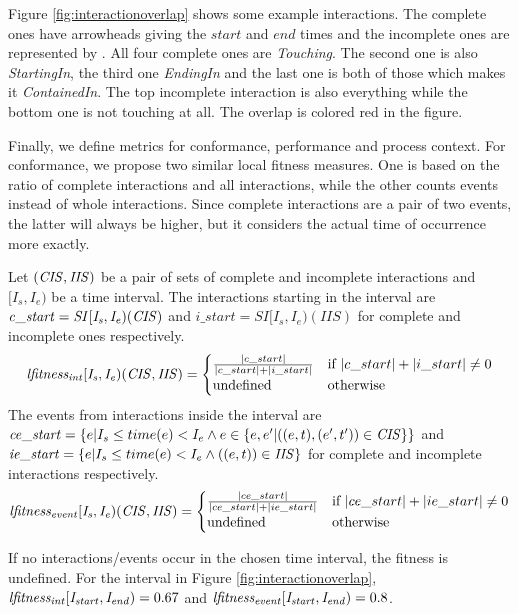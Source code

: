 Figure \ref{fig:interactionoverlap} shows some example interactions. The complete ones have arrowheads giving the $start$ and $end$ times and the incomplete ones are represented by \texttimes. All four complete ones are \emph{Touching}. The second one is also \emph{StartingIn}, the third one \emph{EndingIn} and the last one is both of those which makes it \emph{ContainedIn}. The top incomplete interaction is also everything while the bottom one is not touching at all. The overlap is colored red in the figure.

Finally, we define metrics for conformance, performance and process context.
For conformance, we propose two similar local fitness measures. One is based on the ratio of complete interactions and all interactions, while the other counts events instead of whole interactions. Since complete interactions are a pair of two events, the latter will always be higher, but it considers the actual time of occurrence more exactly.
\begin{definition}
Let $\mathit{(CIS, IIS)}$ be a pair of sets of complete and incomplete interactions and $[I_s, I_e)$ be a time interval. The interactions starting in the interval are $\mathit{c\_start = SI[I_s, I_e)(\mathit{CIS})}$ and $\mathit{i\_start = SI[I_s, I_e)(IIS)}$ for complete and incomplete ones respectively.
$$\mathit{lfitness_{int}[I_s, I_e)( \mathit{CIS}, \mathit{IIS} ) = \begin{cases} \frac{|c\_start|}{|c\_start| + |i\_start|} & \text{if } |c\_start| + |i\_start| \neq 0\\
\text{undefined} & \text{otherwise}
\end{cases}}$$
The events from interactions inside the interval are $\mathit{ce\_start} = \{e|I_s \le time(e) < I_e \wedge e \in \{e,e^\prime|((e,t),(e^\prime,t^\prime))\in \mathit{CIS}\}\}$ and $\mathit{ie\_start} = \{e|I_s \le time(e) < I_e \wedge ((e,t)) \in \mathit{IIS}\}$ for complete and incomplete interactions respectively.
$$\mathit{lfitness_{event}[I_s, I_e)( \mathit{CIS}, \mathit{IIS} ) = \begin{cases} \frac{|ce\_start|}{|ce\_start| + |ie\_start|} & \text{if } |ce\_start| + |ie\_start| \neq 0\\
\text{undefined} & \text{otherwise}
\end{cases}}$$
\end{definition}
If no interactions/events occur in the chosen time interval, the fitness is undefined. For the interval in Figure \ref{fig:interactionoverlap}, $\mathit{lfitness_{int}[I_{start}, I_{end})} = 0.67$ and $\mathit{lfitness_{event}[I_{start}, I_{end})} = 0.8$.

